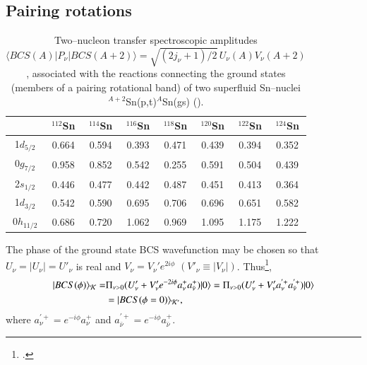 \subsection{Pairing rotations}

\begin{table}[h!]
{\begin{tabular}{|c|c|c|c|c|c|c|c|}
\cline{1-8} 
& $^{112}$Sn & $^{114}$Sn&  $^{116}$Sn & $^{118}$Sn&  $^{120}$Sn &  $^{122}$Sn &  $^{124}$Sn          \\
\hline
1$d_{5/2}$            & 0.664      &  0.594   & 0.393    & 0.471      & 0.439     &  0.394    &  0.352                  \\
\hline 
0$g_{7/2}$            &  0.958     &  0.852  &  0.542     &  0.255   &  0.591      &  0.504  &   0.439                 \\
\hline 
2$s_{1/2}$            &  0.446    & 0.477    &  0.442    &  0.487     &  0.451   &  0.413     & 0.364                   \\
\hline 
1$d_{3/2}$            &  0.542    & 0.590   &  0.695    &  0.706     &  0.696   & 0.651   &   0.582                 \\
\hline 
0$h_{11/2}$            & 0.686     & 0.720    &  1.062     &  0.969     &  1.095   &  1.175    &   1.222                 \\
\hline 
\end{tabular}}
\caption{Two--nucleon transfer spectroscopic amplitudes \mbox{$\langle BCS(A)|P_{\nu}|BCS(A+2)\rangle=\sqrt{(2j_{\nu}+1)/2}\,U_{\nu}(A)V_{\nu}(A+2)$}, associated with the  reactions connecting the ground states (members of a pairing rotational band) of two superfluid Sn--nuclei $^{A+2}$Sn(p,t)$^A$Sn(gs) (\cite{Potel:13,Potel:13b}).}\label{tab8_2_1}
\end{table}
The phase of the ground state BCS wavefunction may be chosen so that $U_{\nu} = |U_{\nu}| = U'_{\nu}$
is real and $V_{\nu} = V_{\nu}' e^{2 i \phi}$ $(V'_{\nu} \equiv |V_{\nu}|)$. Thus\footnote{\cite{Schrieffer:73}.},
\begin{align}
\nonumber |BCS(\phi)\rangle_{\cal K}  =& \Pi_{\nu>0} (U'_{\nu} + V'_{\nu} e^{-2 i \phi} a^+_{\nu} a^+_{\bar \nu}) |0\rangle = 
\Pi_{\nu>0} (U'_{\nu} + V'_{\nu} a^{'+}_{\nu} a^{'+}_{\bar \nu}) |0\rangle  \\
&=|BCS(\phi =0)\rangle_{\cal K'},
\label{mean}
\end{align}
where $a^{'+}_{\nu} = e^{-i \phi}a^+_{\nu}$ and   $a^{'+}_{\bar \nu} = e^{-i \phi}a^+_{\bar \nu}$.
